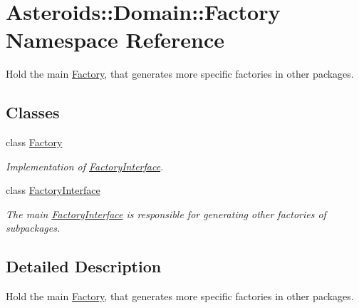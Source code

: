 \hypertarget{namespaceAsteroids_1_1Domain_1_1Factory}{}\section{Asteroids\+:\+:Domain\+:\+:Factory Namespace Reference}
\label{namespaceAsteroids_1_1Domain_1_1Factory}


Hold the main \hyperlink{classAsteroids_1_1Domain_1_1Factory_1_1Factory}{Factory}, that generates more specific factories in other packages.  


\subsection*{Classes}
\begin{DoxyCompactItemize}
\item 
class \hyperlink{classAsteroids_1_1Domain_1_1Factory_1_1Factory}{Factory}
\begin{DoxyCompactList}\small\item\em Implementation of \hyperlink{classAsteroids_1_1Domain_1_1Factory_1_1FactoryInterface}{Factory\+Interface}. \end{DoxyCompactList}\item 
class \hyperlink{classAsteroids_1_1Domain_1_1Factory_1_1FactoryInterface}{Factory\+Interface}
\begin{DoxyCompactList}\small\item\em The main \hyperlink{classAsteroids_1_1Domain_1_1Factory_1_1FactoryInterface}{Factory\+Interface} is responsible for generating other factories of subpackages. \end{DoxyCompactList}\end{DoxyCompactItemize}


\subsection{Detailed Description}
Hold the main \hyperlink{classAsteroids_1_1Domain_1_1Factory_1_1Factory}{Factory}, that generates more specific factories in other packages. 